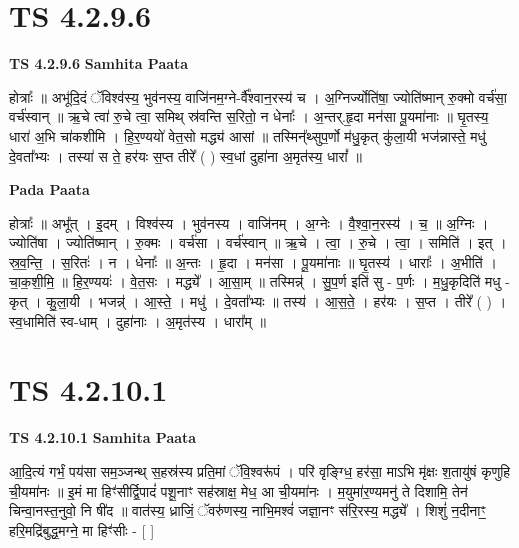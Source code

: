 \documentclass[17pt]{extarticle}
\begin{document}
\section{ TS 4.2.9.6 }

\textbf{TS 4.2.9.6 } \newline
\textbf{Samhita Paata} \newline

होत्राः᳚ ॥ अभू॑दि॒दं ॅविश्व॑स्य॒ भुव॑नस्य॒ वाजि॑नम॒ग्ने-र्वै᳚श्वान॒रस्य॑ च । अ॒ग्निर्ज्योति॑षा॒ ज्योति॑ष्मान् रु॒क्मो वर्च॑सा॒ वर्च॑स्वान् ॥ ऋ॒चे त्वा॑ रु॒चे त्वा॒ समिथ् स्र॑वन्ति स॒रितो॒ न धेनाः᳚ । अ॒न्तर्.हृ॒दा मन॑सा पू॒यमा॑नाः ॥ घृ॒तस्य॒ धारा॑ अ॒भि चा॑कशीमि । हि॒र॒ण्ययो॑ वेत॒सो मद्ध्य॑ आसां ॥ तस्मिन्᳚थ्सुप॒र्णो म॑धु॒कृत् कु॑ला॒यी भज॑न्नास्ते॒ मधु॑ दे॒वता᳚भ्यः । तस्या॑ स ते॒ हर॑यः स॒प्त तीरे᳚ ( ) स्व॒धां दुहा॑ना अ॒मृत॑स्य॒ धारां᳚ ॥ \newline

\textbf{Pada Paata} \newline

होत्राः᳚ ॥ अभू᳚त् । इ॒दम् । विश्व॑स्य । भुव॑नस्य । वाजि॑नम् । अ॒ग्नेः । वै॒श्वा॒न॒रस्य॑ । च॒ ॥ अ॒ग्निः । ज्योति॑षा । ज्योति॑ष्मान् । रु॒क्मः । वर्च॑सा । वर्च॑स्वान् ॥ ऋ॒चे । त्वा॒ । रु॒चे । त्वा॒ । समिति॑ । इत् । स्र॒व॒न्ति॒ । स॒रितः॑ । न । धेनाः᳚ ॥ अ॒न्तः । हृ॒दा । मन॑सा । पू॒यमा॑नाः ॥ घृ॒तस्य॑ । धाराः᳚ । अ॒भीति॑ । चा॒क॒शी॒मि॒ ॥ हि॒र॒ण्ययः॑ । वे॒त॒सः । मद्ध्ये᳚ । आ॒सा॒म् ॥ तस्मिन्न्॑ । सु॒प॒र्ण इति॑ सु - प॒र्णः । म॒धु॒कृदिति॑ मधु - कृत् । कु॒ला॒यी । भजन्न्॑ । आ॒स्ते॒ । मधु॑ । दे॒वता᳚भ्यः ॥ तस्य॑ । आ॒स॒ते॒ । हर॑यः । स॒प्त । तीरे᳚ ( ) । स्व॒धामिति॑ स्व-धाम् । दुहा॑नाः । अ॒मृत॑स्य । धारा᳚म् ॥  \newline





\section{ TS 4.2.10.1 }

\textbf{TS 4.2.10.1 } \newline
\textbf{Samhita Paata} \newline

आ॒दि॒त्यं गर्भं॒ पय॑सा सम॒ञ्जन्थ् स॒हस्र॑स्य प्रति॒मां ॅवि॒श्वरू॑पं । परि॑ वृङ्ग्धि॒ हर॑सा॒ माऽभि मृ॑क्षः श॒तायु॑षं कृणुहि ची॒यमा॑नः ॥ इ॒मं मा हिꣳ॑सीर्द्वि॒पादं॑ पशू॒नाꣳ सह॑स्राक्ष॒ मेध॒ आ ची॒यमा॑नः । म॒युमा॑र॒ण्यमनु॑ ते दिशामि॒ तेन॑ चिन्वा॒नस्त॒नुवो॒ नि षी॑द ॥ वात॑स्य॒ ध्राजिं॒ ॅवरु॑णस्य॒ नाभि॒मश्वं॑ जज्ञा॒नꣳ स॑रि॒रस्य॒ मद्ध्ये᳚ । शिशुं॑ न॒दीनाꣳ॒॒ हरि॒मद्रि॑बुद्ध॒मग्ने॒ मा हिꣳ॑सीः - [  ] \newline
\end{document}
